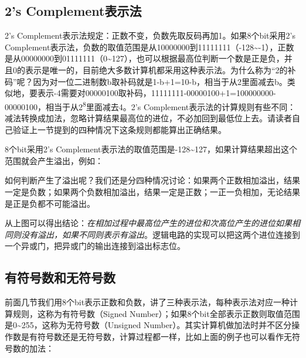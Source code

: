 \subsection{2's Complement表示法}
%


2's Complement表示法规定：正数不变，负数先取反码再加1。如果8个bit采用2's Complement表示法，负数的取值范围是从10000000到11111111（-128\textasciitilde{}\BookSplit{}-1），正数是从00000000到01111111（0\textasciitilde{}\BookSplit{}127），也可以根据最高位判断一个数是正是负，并且0的表示是唯一的，目前绝大多数计算机都采用这种表示法。为什么称为“2的补码”呢？因为对一位二进制数b取补码就是1-b+\BookSplit{}1=\BookSplit{}10-b，相当于从2里面减去b。类似地，要表示-4需要对00000100取补码，11111111-00000100+\BookSplit{}1=\BookSplit{}100000000-00000100，相当于从2\textsuperscript{8}里面减去4。2's Complement表示法的计算规则有些不同：减法转换成加法，忽略计算结果最高位的进位，不必加回到最低位上去。请读者自己验证上一节提到的四种情况下这条规则都能算出正确结果。



8个bit采用2's Complement表示法的取值范围是-128\textasciitilde{}\BookSplit{}127，如果计算结果超出这个范围就会产生溢出，例如：




如何判断产生了溢出呢？我们还是分四种情况讨论：如果两个正数相加溢出，结果一定是负数；如果两个负数相加溢出，结果一定是正数；一正一负相加，无论结果是正是负都不可能溢出。




从上图可以得出结论：\emph{在相加过程中最高位产生的进位和次高位产生的进位如果相同则没有溢出，如果不同则表示有溢出}。逻辑电路的实现可以把这两个进位连接到一个异或门，把异或门的输出连接到溢出标志位。


\subsection{有符号数和无符号数}
%


前面几节我们用8个bit表示正数和负数，讲了三种表示法，每种表示法对应一种计算规则，这称为有符号数（Signed Number）；如果8个bit全部表示正数则取值范围是0\textasciitilde{}\BookSplit{}255，这称为无符号数（Unsigned Number）。其实计算机做加法时并不区分操作数是有符号数还是无符号数，计算过程都一样，比如上面的例子也可以看作无符号数的加法：


